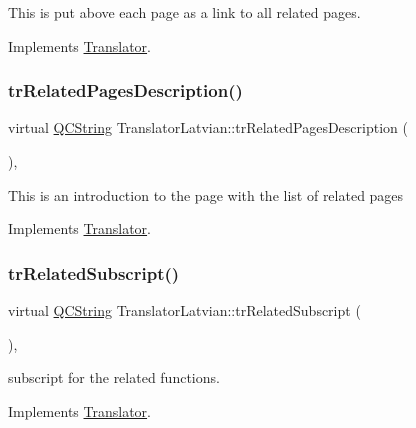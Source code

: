 This is put above each page as a link to all related pages. 

Implements \mbox{\hyperlink{class_translator}{Translator}}.

\mbox{\label{class_translator_latvian_aaa089fd18d76d73605066a318c73c7ef}} 
\subsubsection{\texorpdfstring{trRelatedPagesDescription()}{trRelatedPagesDescription()}}
{\footnotesize\ttfamily virtual \mbox{\hyperlink{class_q_c_string}{Q\+C\+String}} Translator\+Latvian\+::tr\+Related\+Pages\+Description (\begin{DoxyParamCaption}{ }\end{DoxyParamCaption})\hspace{0.3cm}{\ttfamily [inline]}, {\ttfamily [virtual]}}

This is an introduction to the page with the list of related pages 

Implements \mbox{\hyperlink{class_translator}{Translator}}.

\mbox{\label{class_translator_latvian_a1d22bc3c12c4e3c45c91d34f69c65cdf}} 
\subsubsection{\texorpdfstring{trRelatedSubscript()}{trRelatedSubscript()}}
{\footnotesize\ttfamily virtual \mbox{\hyperlink{class_q_c_string}{Q\+C\+String}} Translator\+Latvian\+::tr\+Related\+Subscript (\begin{DoxyParamCaption}{ }\end{DoxyParamCaption})\hspace{0.3cm}{\ttfamily [inline]}, {\ttfamily [virtual]}}

subscript for the related functions. 

Implements \mbox{\hyperlink{class_translator}{Translator}}.

\mbox{\label{class_translator_latvian_a5acec088893bb72e8f984901a067c832}} 
